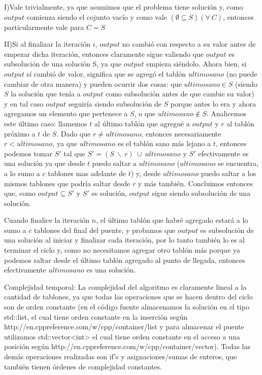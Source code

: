 \documentclass{article}
\begin{document}
\vspace{0.3cm}\noindent I)Vale trivialmente, ya que asumimos que el problema tiene soluci\'on y, como $output$ comienza siendo el cojunto vac\'io y como vale $(\emptyset \subseteq S)(\forall \ C)$, entonces particularmente vale para $C = S$

\vspace{0.4cm}\noindent II)Si al finalizar la iteraci\'on $i$, $output$ no cambi\'o con respecto a su valor antes de empezar dicha iteraci\'on, entonces claramente sigue valiendo que $output$ es subsoluci\'on de una soluci\'on S, ya que $output$ empieza si\'endolo. Ahora bien, si $output$ s\'i cambi\'o de valor, significa que se agreg\'o el tabl\'on $ultimosano$ (no puede cambiar de otra manera) y pueden ocurrir dos cosas: que $ultimosano \in S$ (siendo $S$ la soluci\'on que ten\'ia a $output$ como subsoluci\'on antes de que cambie su valor) y en tal caso $output$ seguir\'ia siendo subsoluci\'on de $S$ porque antes lo era y ahora agregamos un elemento que pertenece a $S$, o que $ultimosano \notin S$. Analicemos este \'ultimo caso: llamemos $t$ al \'ultimo tabl\'on que agregu\'e a $output$ y $r$ al tabl\'on pr\'oximo a $t$ de $S$. Dado que $r \neq ultimosano$, entonces necesariamente $r < ultimosano$, ya que $ultimosano$ es el tabl\'on sano m\'as lejano a $t$, entonces podemos tomar $S'$ tal que $S' = (S \ \backslash \ r) \ \cup \ ultimosano$ y $S'$ efectivamente es una soluci\'on ya que desde $t$ puedo saltar a $ultimosano$ ($ultimosano$ se encuentra, a lo sumo a $c$ tablones mas adelante de $t$) y, desde $ultimosano$ puedo saltar a los mismos tablones que podr\'ia saltar desde $r$ y m\'as tambi\'en. Concluimos entonces que, como $output \subseteq S'$ y $S'$ es soluci\'on, $output$ sigue siendo subsoluci\'on de una soluci\'on.

\vspace{0.4cm}\noindent Cuando finalice la iteraci\'on $n$,  el \'ultimo tabl\'on que habr\'e agregado estar\'a a lo sumo a $c$ tablones del final del puente, y probamos que $output$ es subsoluci\'on de una soluci\'on al iniciar y finalizar cada iteraci\'on, por lo tanto tambi\'en lo es al terminar el ciclo y, como no necesitamos agregar otro tabl\'on m\'as porque ya podemos saltar desde el \'ultimo tabl\'on agregado al punto de llegada, entonces efectivamente $ultimosano$ es una soluci\'on.

\vspace{1.5cm}
{\noindent \Huge Complejidad temporal:}
\newline \newline
La complejidad del algoritmo es claramente lineal a la cantidad de tablones, ya que todas las operaciones que se hacen dentro del ciclo son de orden constante (en el c\'odigo fuente almacenamos la soluci\'on en el tipo std::list, el cual tiene orden constante en la inserci\'on seg\'un http://en.cppreference.com/w/cpp/container/list y para almacenar el puente utilizamos std::vector<int> el cual tiene orden constante en el acceso a una posici\'on seg\'un http://en.cppreference.com/w/cpp/container/vector). Todas las dem\'as operaciones realizadas son if's y asignaciones/sumas de enteros, que tambi\'en tienen \'ordenes de complejidad constantes.
\end{document}
